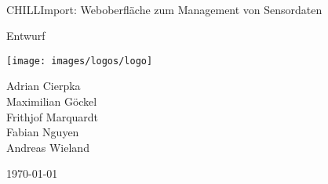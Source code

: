 \documentclass[a4paper, 12pt, titlepage]{article}
\begin{document}
\begin{titlepage}
	\centering
	{\ \vspace{1.5cm}\\ \LARGE CHILLImport: Weboberfläche zum Management von Sensordaten \par}
	\vspace{2cm}
	{\Large Entwurf\par}
	\vspace{2.5cm}
	\texttt{[image: images/logos/logo]}\par\vspace{4cm}
	{\large Adrian Cierpka \\
Maximilian Göckel \\
Frithjof Marquardt \\
Fabian Nguyen \\
Andreas Wieland\par}
	\vfill

	{\large \today\par}
\end{titlepage}

\tableofcontents
\clearpage
{} 


%

%






%

%
\end{document}
